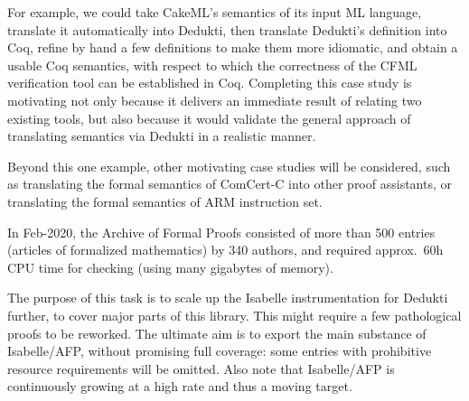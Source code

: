 \begin{workpackage}[id=libraries,wphases=0-48,type=RTD,
  short=Libraries,%
  title=Libraries,
  lead=Inr,
  InrRM=10,
  TumRM=36]
For example, we could take CakeML's semantics of its input ML language,
translate it automatically into Dedukti, then translate Dedukti's
definition into Coq, refine by hand a few definitions to make them more
idiomatic, and obtain a usable Coq semantics, with respect to which
the correctness of the CFML verification tool can be established in Coq.
Completing this case study is motivating not only because it delivers
an immediate result of relating two existing tools, but also because it
would validate the general approach of translating semantics via Dedukti
in a realistic manner.

Beyond this one example, other motivating case studies will be considered,
such as translating the formal semantics of ComCert-C into other proof
assistants, or translating the formal semantics of ARM instruction set.


\begin{tasklist}
\begin{task}[id=mathcomp,title=MathComp]
\end{task}

\begin{task}[id=milc,title=Revised Coq Analysis Library]
\end{task}


\begin{task}[id=afp,title=Isabelle/AFP: The Archive of Formal Proofs]

In Feb-2020, the Archive of Formal Proofs \cite{isabelle-afp}
consisted of more than 500 entries (articles of formalized
mathematics) by 340 authors, and required approx.\ 60h CPU time for
checking (using many gigabytes of memory).

The purpose of this task is to scale up the Isabelle instrumentation
for Dedukti further, to cover major parts of this library.  This might
require a few pathological proofs to be reworked. The ultimate aim is
to export the main substance of Isabelle/AFP, without promising full
coverage: some entries with prohibitive resource requirements will be
omitted. Also note that Isabelle/AFP is continuously growing at a high
rate and thus a moving target.

\end{task}


\end{tasklist}
\end{workpackage}
